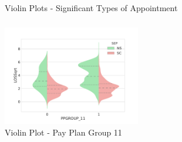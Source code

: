 \documentclass{article}
\begin{document}
\subparagraph{}
\begin{figure}
\centering
{}
\hspace{0mm}
\caption{Violin Plots - Significant Types of Appointment}
\label{fig:ViolinTOA}
\end{figure}

\subparagraph{}
\begin{figure}[H]
\centering
\includegraphics[width=60mm]{Violin_PPGROUP_11.pdf}
\caption{Violin Plot - Pay Plan Group 11}
\label{fig:ViolinPPGROUP}
\end{figure}
\end{document}
